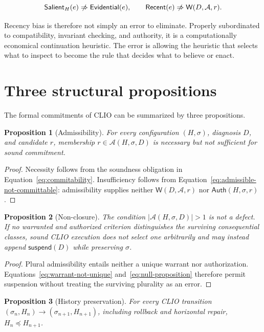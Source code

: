 \documentclass[11pt]{article}
\newtheorem{proposition}{Proposition}
\begin{document}
\begin{equation}
\mathsf{Salient}_H(e)
\centernot\Rightarrow
\mathsf{Evidential}(e),
\qquad
\mathsf{Recent}(e)
\centernot\Rightarrow
\mathsf W(D,\mathcal A,r).
\end{equation}

Recency bias is therefore not simply an error to eliminate. Properly subordinated to compatibility, invariant checking, and authority, it is a computationally economical continuation heuristic. The error is allowing the heuristic that selects what to inspect to become the rule that decides what to believe or enact.

\section{Three structural propositions}

The formal commitments of CLIO can be summarized by three propositions.

\begin{proposition}[Admissibility]
For every configuration $(H,\sigma)$, diagnosis $D$, and candidate $r$, membership $r\in\mathcal A(H,\sigma,D)$ is necessary but not sufficient for sound commitment.
\end{proposition}

\begin{proof}
Necessity follows from the soundness obligation in Equation~\eqref{eq:commitability}. Insufficiency follows from Equation~\eqref{eq:admissible-not-committable}: admissibility supplies neither $\mathsf W(D,\mathcal A,r)$ nor $\mathsf{Auth}(H,\sigma,r)$.
\end{proof}

\begin{proposition}[Non-closure]
The condition $|\mathcal A(H,\sigma,D)|>1$ is not a defect. If no warranted and authorized criterion distinguishes the surviving consequential classes, sound CLIO execution does not select one arbitrarily and may instead append $\mathsf{suspend}(D)$ while preserving $\sigma$.
\end{proposition}

\begin{proof}
Plural admissibility entails neither a unique warrant nor authorization. Equations~\eqref{eq:warrant-not-unique} and~\eqref{eq:null-proposition} therefore permit suspension without treating the surviving plurality as an error.
\end{proof}

\begin{proposition}[History preservation]
For every CLIO transition $(\sigma_n,H_n)\to(\sigma_{n+1},H_{n+1})$, including rollback and horizontal repair, $H_n\preceq H_{n+1}$.
\end{proposition}
\end{document}
